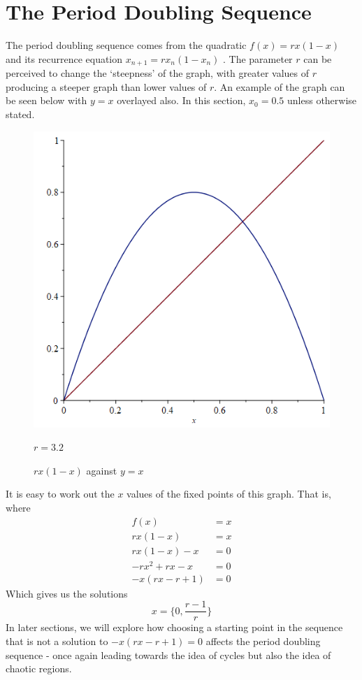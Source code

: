 \documentclass[12pt]{article}
\begin{document}
\section{The Period Doubling Sequence}\label{s_per}
The period doubling sequence comes from the quadratic $f(x)=rx(1-x)$  and its recurrence equation $x_{n+1}=rx_n(1-x_n)$ . The parameter $r$ can be perceived to change the `steepness' of the graph, with greater values of $r$ producing a steeper graph than lower values of $r$. An example of the graph can be seen below with $y=x$ overlayed also. In this section, $x_0=0.5$ unless otherwise stated.
	\begin{figure}[H]
		\begin{minipage}{0.725\textwidth}
			\hfill
			\includegraphics[scale=0.4]{periodExample.png}
		\end{minipage}
	\hfill
		\begin{minipage}{0.2\textwidth}
			$r=3.2$
		\end{minipage}
	\caption{$rx(1-x)$ against $y=x$}
	\label{fig:mobAsl}
	\end{figure}
It is easy to work out the $x$ values of the fixed points of this graph. That is, where
	\begin{equation*}
		\begin{aligned}
			f(x)       & =x \\
			rx(1-x)    & =x \\
			rx(1-x)-x  & =0 \\
			-rx^2+rx-x & =0 \\
			-x(rx-r+1) & =0
		\end{aligned}
	\end{equation*}
Which gives us the solutions
\[x = \Big \{0, \frac{r-1}{r}\Big \}\]
In later sections, we will explore how choosing a starting point in the sequence that is not a solution to $-x(rx-r+1)=0$ affects the period doubling sequence - once again leading towards the idea of cycles but also the idea of chaotic regions.
\newpage
\end{document}
